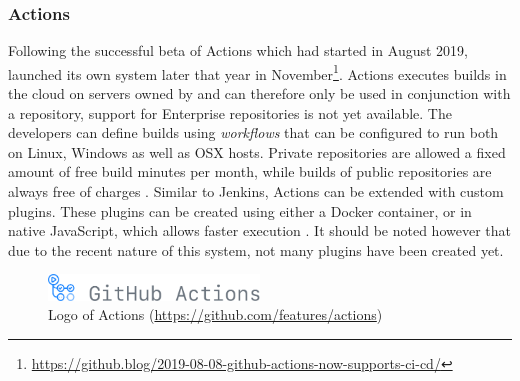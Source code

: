 
\subsubsection{\github{} Actions}\label{sssec:github-actions}
Following the successful beta of \github{} Actions which had started in August 2019, \github{} launched its own \CI{} system later that year in November\footnote{\url{https://github.blog/2019-08-08-github-actions-now-supports-ci-cd/}}. \github{} Actions executes builds in the cloud on servers owned by \github{} and can therefore only be used in conjunction with a \github{} repository, support for \github{} Enterprise repositories is not yet available. The developers can define builds using \emph{workflows} that can be configured to run both on Linux, Windows as well as OSX hosts. Private repositories are allowed a fixed amount of free build minutes per month, while builds of public repositories are always free of charges \cite{githubactions}. Similar to Jenkins, \github{} Actions can be extended with custom plugins. These plugins can be created using either a Docker container, or in native JavaScript, which allows faster execution \cite{aboutgithubactions}. It should be noted however that due to the recent nature of this system, not many plugins have been created yet.

\begin{figure}[htbp!]
	\centering
	\includegraphics[width=0.5\textwidth]{assets/images/github-actions.pdf}
	\caption{Logo of \github{} Actions (\url{https://github.com/features/actions})}
	\label{fig:github-actions}
\end{figure}